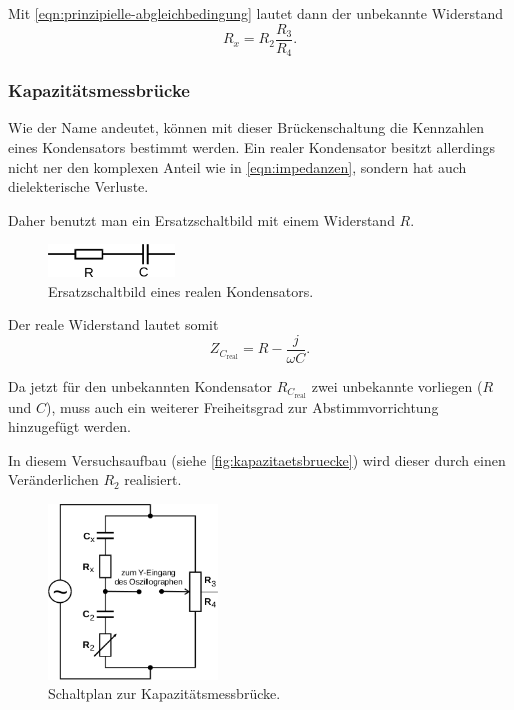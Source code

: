 Mit \autoref{eqn:prinzipielle-abgleichbedingung} lautet dann der unbekannte Widerstand
\begin{equation}
	R_x = R_2 \frac{R_3}{R_4}.
	\label{eqn:wheatstone-rx}
\end{equation}

\subsubsection{Kapazitätsmessbrücke}
\label{sec:theorie-kapazitaetsmessbruecke}

Wie der Name andeutet, können mit dieser Brückenschaltung die Kennzahlen eines Kondensators bestimmt werden.
Ein realer Kondensator besitzt allerdings nicht ner den komplexen Anteil wie in \autoref{eqn:impedanzen},
sondern hat auch dielekterische Verluste.

Daher benutzt man ein Ersatzschaltbild mit einem Widerstand $R$.
\begin{figure}[H]
	\centering
	\includegraphics[width=0.3\textwidth]{bilder/ersatz-kapazitaet.png}
	\caption{Ersatzschaltbild eines realen Kondensators.}
	\label{fig:ersatz-kondensator}
\end{figure}
Der reale Widerstand lautet somit
\begin{equation}
	Z_{C_\text{real}} = R - \frac{j}{\omega C}.
	\label{eqn:realer-wderstand-kondensator}
\end{equation}

Da jetzt für den unbekannten Kondensator $R_{C_\text{real}}$ zwei unbekannte vorliegen ($R$ und $C$), muss 
auch ein weiterer Freiheitsgrad zur Abstimmvorrichtung hinzugefügt werden.

In diesem Versuchsaufbau (siehe \autoref{fig:kapazitaetsbruecke}) wird dieser durch einen Veränderlichen $R_2$
realisiert.
\begin{figure}[H]
	\centering
	\includegraphics[width=0.4\textwidth]{bilder/kapazitaetsbruecke.png}
	\caption{Schaltplan zur Kapazitätsmessbrücke.}
	\label{fig:kapazitaetsbruecke}
\end{figure}

